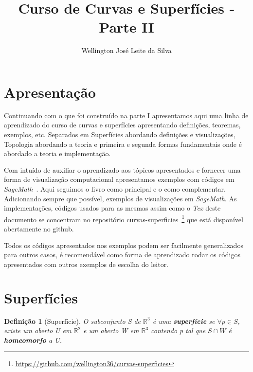 \documentclass[12pt]{article}
\title{Curso de Curvas e Superfícies - Parte II}
\author{Wellington José Leite da Silva\inst{1}}
\date{}
\newtheorem{definition}{Definição}
\newcommand{\furl}[1]{\footnote{\url{#1}}}
\begin{document}
\maketitle

\section*{Apresentação}\label{s1}
Continuando com o que foi construído na parte I apresentamos aqui uma linha de aprendizado do curso de curvas e superfícies apresentando definições, teoremas, exemplos, etc. Separados em Superfícies abordando definições e visualizações, Topologia abordando a teoria e primeira e segunda formas fundamentais onde é abordado a teoria e implementação.

Com intuído de auxiliar o aprendizado aos tópicos apresentados e fornecer uma forma de visualização computacional apresentamos exemplos com códigos em \textit{SageMath}~\cite{sagemath}. Aqui seguimos o livro \cite{bookmain} como principal e o \cite{manfredo} como complementar. Adicionando sempre que possível, exemplos de visualizações em \textit{SageMath}. As implementações, códigos usados para as mesmas assim como o \textit{Tex} deste documento se concentram no repositório curvas-superficies~\furl{https://github.com/wellington36/curvas-superficies} que está disponível abertamente no github.

Todos os códigos apresentados nos exemplos podem ser facilmente generalizados para outros casos, é recomendável como forma de aprendizado rodar os códigos apresentados com outros exemplos de escolha do leitor.

\section{Superfícies}\label{s2}
\begin{definition}[Superfície]
O subconjunto S de $\mathbb{R}^3$ é uma \textbf{superfície} se $\forall p \in S$, existe um aberto U em $\mathbb{R}^2$ e um aberto W em $\mathbb{R}^3$ contendo p tal que $S \cap W$ é \textbf{homeomorfo} a U.
\end{definition}
\end{document}
